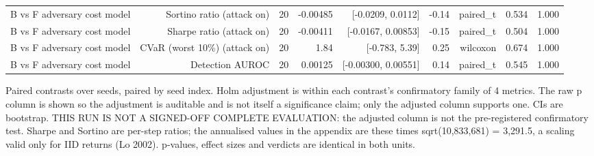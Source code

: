 \begin{table}[htbp]
\begin{tabular}{lrrrrrrrr}
    B vs F   adversary cost model & Sortino ratio (attack on) & 20 & -0.00485 & [-0.0209, 0.0112] & -0.14 & paired\_t & 0.534 & 1.000 \\
    B vs F   adversary cost model & Sharpe ratio (attack on) & 20 & -0.00411 & [-0.0167, 0.00853] & -0.15 & paired\_t & 0.504 & 1.000 \\
    B vs F   adversary cost model & CVaR (worst 10\%) (attack on) & 20 & 1.84 & [-0.783, 5.39] & 0.25 & wilcoxon & 0.674 & 1.000 \\
    B vs F   adversary cost model & Detection AUROC & 20 & 0.00125 & [-0.00300, 0.00551] & 0.14 & paired\_t & 0.545 & 1.000 \\
    \bottomrule
  \end{tabular}
  \begin{minipage}{\linewidth}\vspace{4pt}\footnotesize Paired contrasts over seeds, paired by seed index. Holm adjustment is within each contrast's confirmatory family of 4 metrics. The raw p column is shown so the adjustment is auditable and is not itself a significance claim; only the adjusted column supports one. CIs are bootstrap. THIS RUN IS NOT A SIGNED-OFF COMPLETE EVALUATION: the adjusted column is not the pre-registered confirmatory test. Sharpe and Sortino are per-step ratios; the annualised values in the appendix are these times sqrt(10,833,681) = 3,291.5, a scaling valid only for IID returns (Lo 2002). p-values, effect sizes and verdicts are identical in both units.\end{minipage}
\end{table}
